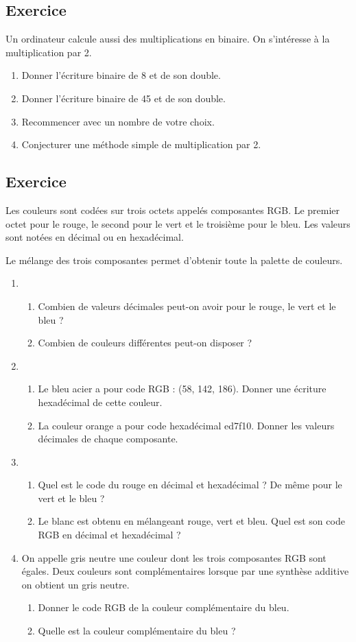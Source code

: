 \documentclass[11pt,a4paper]{article}
\newcounter{numexo}
\begin{document}
\addtocounter{numexo}{1}
\subsection*{\Large Exercice \thenumexo }
Un ordinateur calcule aussi des multiplications en binaire. On s'intéresse à la multiplication par 2.
\begin{enumerate}
\item Donner l'écriture binaire de 8 et de son double.
\item Donner l'écriture binaire de 45 et de son double.
\item Recommencer avec un nombre de votre choix. 
\item Conjecturer une méthode simple de multiplication par 2.
\end{enumerate}

\addtocounter{numexo}{1}
\subsection*{\Large Exercice \thenumexo }
Les couleurs sont codées sur trois octets appelés composantes RGB. Le premier octet pour le rouge, le second pour le vert et le troisième pour le bleu. Les valeurs sont notées en décimal ou en hexadécimal.

Le mélange des trois composantes permet d'obtenir toute la palette de couleurs.
\begin{enumerate}
\item \begin{enumerate}
\item Combien de valeurs décimales peut-on avoir pour le rouge, le vert et le bleu ?
\item Combien de couleurs différentes peut-on disposer ?
\end{enumerate}
\item \begin{enumerate}
\item Le bleu acier a pour code RGB : (58, 142, 186). Donner une écriture hexadécimal de cette couleur.
\item La couleur orange a pour code hexadécimal ed7f10. Donner les valeurs décimales de chaque composante.
\end{enumerate}
\item \begin{enumerate}
\item Quel est le code du rouge en décimal et hexadécimal ? De même pour le vert et le bleu ?
\item Le blanc est obtenu en mélangeant rouge, vert et bleu. Quel est son code RGB en décimal et hexadécimal ?
\end{enumerate}
\item On appelle gris neutre une couleur dont les trois composantes RGB sont égales. Deux couleurs sont complémentaires lorsque par une synthèse additive on obtient un gris neutre.
\begin{enumerate}
\item Donner le code RGB de la couleur complémentaire du bleu.
\item Quelle est la couleur complémentaire du bleu ?
\end{enumerate}
\end{enumerate}
\end{document}
